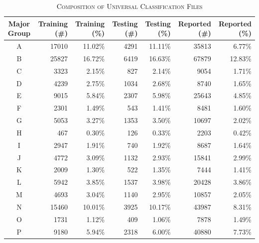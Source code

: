 \documentclass[11pt]{article}
\begin{document}
\begin{table}[t]
    \centering
    \begin{threeparttable}
    \caption{\textsc{Composition of Universal Classification Files}} \label{tab:universal_file}
    \begin{tabularx}{\textwidth}{c|r|r|r|r|r|r}
    	 \hline
         Major Group & Training (\#) & Training (\%) & Testing (\#) & Testing (\%) & Reported (\#) & Reported (\%) \\
         \hline
			A & \num{17010} & \num{11.02}\% & \num{4291} & \num{11.11}\% & \num{35813} & \num{6.77}\% \\
			\hdashline
			B & \num{25827} & \num{16.72}\% & \num{6419} & \num{16.63}\% & \num{67879} & \num{12.83}\% \\
			\hdashline
			C & \num{3323} & \num{2.15}\% & \num{827} & \num{2.14}\% & \num{9054} & \num{1.71}\% \\
			D & \num{4239} & \num{2.75}\% & \num{1034} & \num{2.68}\% & \num{8740} & \num{1.65}\% \\
			\hdashline
			E & \num{9015} & \num{5.84}\% & \num{2307} & \num{5.98}\% & \num{25643} & \num{4.85}\% \\
			F & \num{2301} & \num{1.49}\% & \num{543} & \num{1.41}\% & \num{8481} & \num{1.60}\% \\
			G & \num{5053} & \num{3.27}\% & \num{1353} & \num{3.50}\% & \num{10697} & \num{2.02}\% \\
			H & \num{467} & \num{0.30}\% & \num{126} & \num{0.33}\% & \num{2203} & \num{0.42}\% \\
			\hdashline
			I & \num{2947} & \num{1.91}\% & \num{740} & \num{1.92}\% & \num{8687} & \num{1.64}\% \\
			J & \num{4772} & \num{3.09}\% & \num{1132} & \num{2.93}\% & \num{15841} & \num{2.99}\% \\
			K & \num{2009} & \num{1.30}\% & \num{522} & \num{1.35}\% & \num{7444} & \num{1.41}\% \\
			L & \num{5942} & \num{3.85}\% & \num{1537} & \num{3.98}\% & \num{20428} & \num{3.86}\% \\
			M & \num{4693} & \num{3.04}\% & \num{1140} & \num{2.95}\% & \num{10857} & \num{2.05}\% \\
			N & \num{15460} & \num{10.01}\% & \num{3925} & \num{10.17}\% & \num{43987} & \num{8.31}\% \\
			O & \num{1731} & \num{1.12}\% & \num{409} & \num{1.06}\% & \num{7878} & \num{1.49}\% \\
			P & \num{9180} & \num{5.94}\% & \num{2318} & \num{6.00}\% & \num{40880} & \num{7.73}\% \\

\end{tabularx}
\end{threeparttable}
\end{table}
\end{document}
